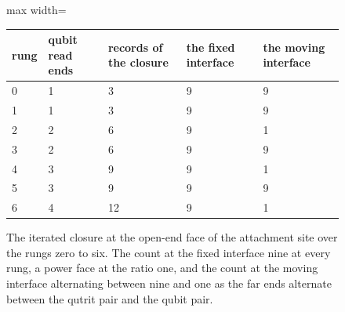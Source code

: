 \begin{figure}[h]
\centering
\begin{adjustbox}{max width=\linewidth}\begin{tabular}{lllll}
\hline
rung & qubit read ends & records of the closure & the fixed interface & the moving interface \\
\hline
0 & 1 & 3 & 9 & 9 \\
1 & 1 & 3 & 9 & 9 \\
2 & 2 & 6 & 9 & 1 \\
3 & 2 & 6 & 9 & 9 \\
4 & 3 & 9 & 9 & 1 \\
5 & 3 & 9 & 9 & 9 \\
6 & 4 & 12 & 9 & 1 \\
\hline
\end{tabular}\end{adjustbox}
\caption{The iterated closure at the open-end face of the attachment site over the rungs zero to six. The count at the fixed interface nine at every rung, a power face at the ratio one, and the count at the moving interface alternating between nine and one as the far ends alternate between the qutrit pair and the qubit pair.}
\end{figure}
